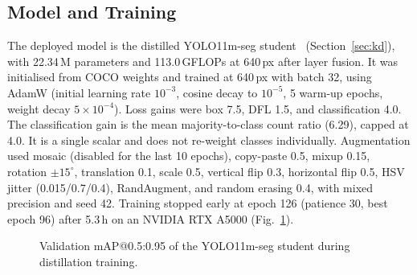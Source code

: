 \documentclass[conference]{IEEEtran}
\begin{document}
\subsection{Model and Training}
The deployed model is the distilled YOLO11m-seg student~\cite{yolo11} (Section~\ref{sec:kd}), with 22.34\,M parameters and 113.0\,GFLOPs at 640\,px after layer fusion. It was initialised from COCO weights and trained at 640\,px with batch 32, using AdamW (initial learning rate $10^{-3}$, cosine decay to $10^{-5}$, 5 warm-up epochs, weight decay $5{\times}10^{-4}$). Loss gains were box 7.5, DFL 1.5, and classification 4.0. The classification gain is the mean majority-to-class count ratio (6.29), capped at 4.0. It is a single scalar and does not re-weight classes individually. Augmentation used mosaic (disabled for the last 10 epochs), copy-paste 0.5, mixup 0.15, rotation $\pm15^\circ$, translation 0.1, scale 0.5, vertical flip 0.3, horizontal flip 0.5, HSV jitter (0.015/0.7/0.4), RandAugment, and random erasing 0.4, with mixed precision and seed 42. Training stopped early at epoch 126 (patience 30, best epoch 96) after 5.3\,h on an NVIDIA RTX A5000 (Fig.~\ref{fig:curve}).

\begin{figure}[t]
\centering
{}
\caption{Validation mAP@0.5:0.95 of the YOLO11m-seg student during distillation training.}
\label{fig:curve}
\end{figure}
\end{document}
